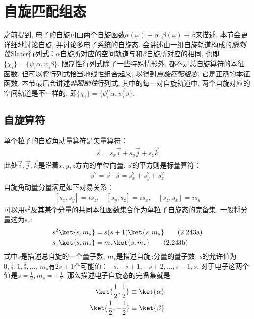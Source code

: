 \section{自旋匹配组态}
\label{sec2.5}
之前提到, 
电子的自旋可由两个自旋函数$\alpha(\omega) \equiv \alpha, \beta(\omega) \equiv \beta$来描述. 
本节会更详细地讨论自旋, 
并讨论多电子系统的自旋态. 
会讲述由一组自旋轨道构成的\emph{限制性}Slater行列式：$\alpha$自旋所对应的空间轨道与和$\beta$自旋所对应的相同, 
也即$\{\chi_i\} = \{\psi_i\alpha,\psi_i\beta\}$. 
限制性行列式除了一些特殊情形外, 
都不是总自旋算符的本征函数. 
但可以将行列式恰当地线性组合起来, 
以得到\emph{自旋匹配组态}, 
它是正确的本征函数. 
本节最后会讲述\emph{非限制性}行列式, 
其中的每一对自旋轨道中, 
两个自旋对应的空间轨道是不一样的, 
即$\{\chi_i\} = \{\psi_i^\alpha\alpha,\psi_i^\beta\beta\}$.

\subsection{自旋算符}
\label{sec2.5.1}
单个粒子的自旋角动量算符是矢量算符：
\begin{align}
\vec{s} = s_x\vec{i} + s_y\vec{j} + s_z\vec{k}
\end{align}
此处$\vec{i},\vec{j},\vec{k}$是沿着$x,y,z$方向的单位向量. 
$\vec{s}$的平方则是标量算符：
\begin{align}\label{eq:2.241}
s^2 = \vec{s}\cdot\vec{s} = s^2_x + s^2_y + s^2_z
\end{align}
自旋角动量分量满足如下对易关系：
\begin{align}\label{eq:2.242}
[s_x,s_y] = is_z,\quad [s_y,s_z] = is_x,\quad [s_z,s_x]=is_y
\end{align}
可以用$s^2$及其某个分量的共同本征函数集合作为单粒子自旋态的完备集, 
一般将分量选为$s_z$:
\begin{subequations}
	\begin{align}
	s^2\ket{s,m_s} & = s(s+1)\ket{s,m_s}\tag{2.243a}\\
	s_z\ket{s,m_s} & = m_s\ket{s,m_s}\tag{2.243b}
	\end{align}
\end{subequations}
式中$s$是描述总自旋的一个量子数, 
$m_s$是描述自旋$z$分量的量子数. 
$s$的允许值为$0,\frac{1}{2},1,\frac{3}{2},\ldots$, 
$m_s$有$2s+1$个可能值：$-s,-s+1,-s+2,\ldots,s-1,s$. 
对于电子这两个值是$s=\frac{1}{2},m_s=\pm\frac{1}{2}$. 
那么描述电子自旋态的完备集就是
\begin{subequations}
	\begin{align}
	\ket{\frac{1}{2},\frac{1}{2}} \equiv \ket{\alpha}\\
	\ket{\frac{1}{2},-\frac{1}{2}} \equiv \ket{\beta}
	\end{align}
\end{subequations}
